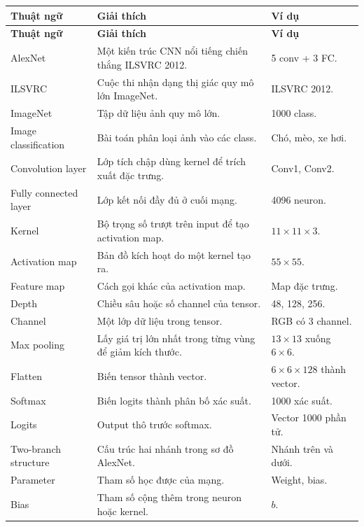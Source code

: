 \small
\begin{longtable}{p{}p{}p{}}
\toprule
\textbf{Thuật ngữ} & \textbf{Giải thích} & \textbf{Ví dụ} \\
\midrule
\endfirsthead

\toprule
\textbf{Thuật ngữ} & \textbf{Giải thích} & \textbf{Ví dụ} \\
\midrule
\endhead

AlexNet & Một kiến trúc CNN nổi tiếng chiến thắng ILSVRC 2012. & 5 conv + 3 FC. \\

ILSVRC & Cuộc thi nhận dạng thị giác quy mô lớn ImageNet. & ILSVRC 2012. \\

ImageNet & Tập dữ liệu ảnh quy mô lớn. & 1000 class. \\

Image classification & Bài toán phân loại ảnh vào các class. & Chó, mèo, xe hơi. \\

Convolution layer & Lớp tích chập dùng kernel để trích xuất đặc trưng. & Conv1, Conv2. \\

Fully connected layer & Lớp kết nối đầy đủ ở cuối mạng. & 4096 neuron. \\

Kernel & Bộ trọng số trượt trên input để tạo activation map. & $11\times11\times3$. \\

Activation map & Bản đồ kích hoạt do một kernel tạo ra. & $55\times55$. \\

Feature map & Cách gọi khác của activation map. & Map đặc trưng. \\

Depth & Chiều sâu hoặc số channel của tensor. & 48, 128, 256. \\

Channel & Một lớp dữ liệu trong tensor. & RGB có 3 channel. \\

Max pooling & Lấy giá trị lớn nhất trong từng vùng để giảm kích thước. & $13\times13$ xuống $6\times6$. \\

Flatten & Biến tensor thành vector. & $6\times6\times128$ thành vector. \\

Softmax & Biến logits thành phân bố xác suất. & 1000 xác suất. \\

Logits & Output thô trước softmax. & Vector 1000 phần tử. \\

Two-branch structure & Cấu trúc hai nhánh trong sơ đồ AlexNet. & Nhánh trên và dưới. \\

Parameter & Tham số học được của mạng. & Weight, bias. \\

Bias & Tham số cộng thêm trong neuron hoặc kernel. & $b$. \\

\bottomrule
\end{longtable}
\normalsize

